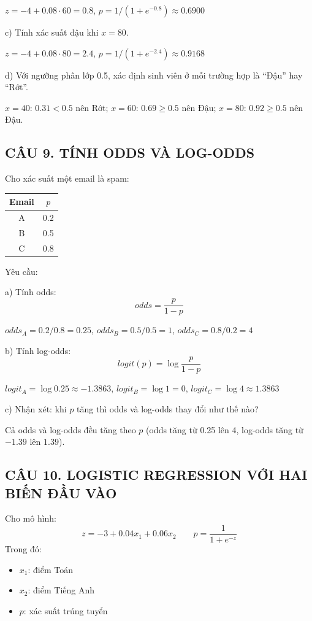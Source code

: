 \documentclass[a4paper,12pt]{article}
\begin{document}
$z = -4 + 0.08 \cdot 60 = 0.8$, $p = 1/(1 + e^{-0.8}) \approx 0.6900$

c) Tính xác suất đậu khi $x = 80$.

$z = -4 + 0.08 \cdot 80 = 2.4$, $p = 1/(1 + e^{-2.4}) \approx 0.9168$

d) Với ngưỡng phân lớp 0.5, xác định sinh viên ở mỗi trường hợp là ``Đậu'' hay ``Rớt''.

$x = 40$: $0.31 < 0.5$ nên Rớt; $x = 60$: $0.69 \geq 0.5$ nên Đậu;
$x = 80$: $0.92 \geq 0.5$ nên Đậu.

\subsection*{CÂU 9. TÍNH ODDS VÀ LOG-ODDS}

Cho xác suất một email là spam:
\begin{center}
\begin{tabular}{|c|c|}
\hline
Email & $p$ \\
\hline
A & 0.2 \\
B & 0.5 \\
C & 0.8 \\
\hline
\end{tabular}
\end{center}

Yêu cầu:

a) Tính odds:
\[ odds = \frac{p}{1-p} \]

$odds_A = 0.2/0.8 = 0.25$, $odds_B = 0.5/0.5 = 1$, $odds_C = 0.8/0.2 = 4$

b) Tính log-odds:
\[ logit(p) = \log\frac{p}{1-p} \]

$logit_A = \log 0.25 \approx -1.3863$, $logit_B = \log 1 = 0$, $logit_C = \log 4 \approx 1.3863$

c) Nhận xét: khi $p$ tăng thì odds và log-odds thay đổi như thế nào?

Cả odds và log-odds đều tăng theo $p$ (odds tăng từ 0.25 lên 4, log-odds tăng từ $-1.39$ lên $1.39$).

\subsection*{CÂU 10. LOGISTIC REGRESSION VỚI HAI BIẾN ĐẦU VÀO}

Cho mô hình:
\[ z = -3 + 0.04x_1 + 0.06x_2 \qquad p = \frac{1}{1 + e^{-z}} \]
Trong đó:
\begin{itemize}
  \item $x_1$: điểm Toán
  \item $x_2$: điểm Tiếng Anh
  \item $p$: xác suất trúng tuyển
\end{itemize}
\end{document}
